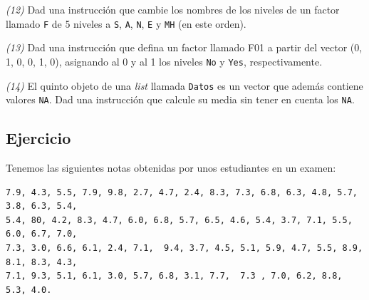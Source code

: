 \documentclass[]{book}
\theoremstyle{definition}
\theoremstyle{definition}
\theoremstyle{definition}
\theoremstyle{remark}
\begin{document}
\emph{(12)} Dad una instrucción que cambie los nombres de los niveles de un factor llamado \texttt{F} de 5 niveles a \texttt{S}, \texttt{A}, \texttt{N}, \texttt{E} y \texttt{MH} (en este orden).

\emph{(13)} Dad una instrucción que defina un factor llamado F01 a partir del vector (0, 1, 0, 0, 1, 0), asignando al 0 y al 1 los niveles \texttt{No} y \texttt{Yes}, respectivamente.

\emph{(14)} El quinto objeto de una \emph{list} llamada \texttt{Datos} es un vector que además contiene valores \texttt{NA}. Dad una instrucción que calcule su media sin tener en cuenta los \texttt{NA}.

\hypertarget{ejercicio-2}{%
\subsection*{Ejercicio}\label{ejercicio-2}}

Tenemos las siguientes notas obtenidas por unos estudiantes en un examen:

\begin{verbatim}
7.9, 4.3, 5.5, 7.9, 9.8, 2.7, 4.7, 2.4, 8.3, 7.3, 6.8, 6.3, 4.8, 5.7, 3.8, 6.3, 5.4, 
5.4, 80, 4.2, 8.3, 4.7, 6.0, 6.8, 5.7, 6.5, 4.6, 5.4, 3.7, 7.1, 5.5, 6.0, 6.7, 7.0, 
7.3, 3.0, 6.6, 6.1, 2.4, 7.1,  9.4, 3.7, 4.5, 5.1, 5.9, 4.7, 5.5, 8.9, 8.1, 8.3, 4.3,
7.1, 9.3, 5.1, 6.1, 3.0, 5.7, 6.8, 3.1, 7.7,  7.3 , 7.0, 6.2, 8.8, 5.3, 4.0.
\end{verbatim}
\end{document}
